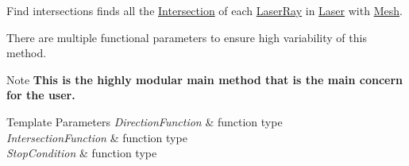 Find intersections finds all the \hyperlink{structraytracer_1_1Intersection}{Intersection} of each \hyperlink{classraytracer_1_1LaserRay}{Laser\+Ray} in \hyperlink{classraytracer_1_1Laser}{Laser} with \hyperlink{classraytracer_1_1Mesh}{Mesh}. 

There are multiple functional parameters to ensure high variability of this method.

\begin{DoxyNote}{Note}
{\bfseries This is the highly modular main method that is the main concern for the user.}
\end{DoxyNote}

\begin{DoxyTemplParams}{Template Parameters}
{\em Direction\+Function} & function type \\
\hline
{\em Intersection\+Function} & function type \\
\hline
{\em Stop\+Condition} & function type \\
\hline
\end{DoxyTemplParams}

